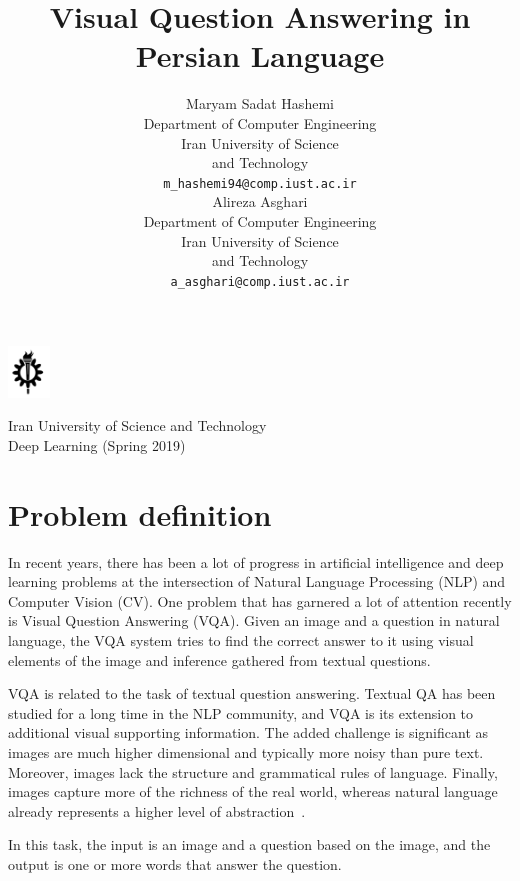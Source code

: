 \documentclass{article}
\title{Visual Question Answering in Persian Language}
\author{%
  Maryam Sadat Hashemi\\
  Department of Computer Engineering\\
  Iran University of Science \\ and Technology\\
  \texttt{m\_hashemi94@comp.iust.ac.ir} \\
   \And
   Alireza Asghari \\
   Department of Computer Engineering\\
   Iran University of Science \\ and Technology\\
   \texttt{a\_asghari@comp.iust.ac.ir} \\
}
\begin{document}
\noindent\begin{minipage}{0.1\textwidth}%
\includegraphics[width=1.1cm]{images/iust_logo.png}
\end{minipage}%
\hfill%
\begin{minipage}{1\textwidth}\raggedright
Iran University of Science and Technology\\
Deep Learning (Spring 2019)\\
\end{minipage}

\maketitle


\section{Problem definition}
 In recent years, there has been a lot of progress in artificial intelligence and deep learning problems at the intersection of Natural Language Processing (NLP) and Computer Vision (CV). One problem that has garnered a lot of attention recently is Visual Question Answering (VQA). Given an image and a question in natural language, the VQA system tries to find the correct answer to it using visual elements of the image and inference gathered from textual questions. 
 
 VQA is related to the task of textual question answering. Textual QA has been studied for a long time in the NLP community, and VQA is its extension to additional visual supporting information. The added challenge is significant as images are much higher dimensional and typically more noisy than pure text. Moreover, images lack the structure and grammatical rules of language. Finally, images capture more of the richness of the real world, whereas natural language already represents a higher level of abstraction~\cite{Srivastava2019VisualQA}.
 
 In this task, the input is an image and a question based on the image, and the output is one or more words that answer the question.
 
\end{document}

